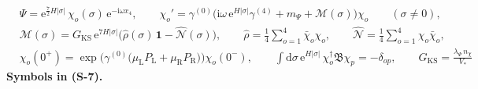 \documentclass[
  10pt,
]{article}
\begin{document}
\[
\begin{aligned}
&\Psi = \mathrm{e}^{\frac72H\lvert\sigma\rvert}\,\chi_o(\sigma)\,\mathrm{e}^{-\mathrm{i}\omega x_4},\qquad
 \chi_o' = \gamma^{(0)}\Big(\mathrm{i}\omega\,\mathrm{e}^{H\lvert\sigma\rvert}\gamma^{(4)} + m_\Psi + \mathcal{M}(\sigma)\Big)\chi_o\qquad(\sigma \ne 0),\\
&\mathcal{M}(\sigma) = G_{\mathrm{KS}}\,\mathrm{e}^{7H\lvert\sigma\rvert}\Big(\hat\rho(\sigma)\,\mathbf{1} - \hat{\mathcal{N}}(\sigma)\Big),\qquad
 \hat\rho = \frac14\sum_{o=1}^{4}\bar\chi_o\chi_o,\qquad \hat{\mathcal{N}} = \frac14\sum_{o=1}^{4}\chi_o\bar\chi_o,\\
&\chi_o(0^+) = \exp\Big(\gamma^{(0)}\big(\mu_{\mathrm{L}}P_{\mathrm{L}} + \mu_{\mathrm{R}}P_{\mathrm{R}}\big)\Big)\chi_o(0^-),\qquad
 \int\mathrm{d}\sigma\,\mathrm{e}^{H\lvert\sigma\rvert}\,\chi_o^\dagger\mathfrak{B}\chi_p = -\delta_{op},\qquad G_{\mathrm{KS}} = \frac{\lambda_\Psi\,n_\chi}{V_*}
\end{aligned} \tag{S-7}
\] \textbf{Symbols in (S-7).}
\end{document}
